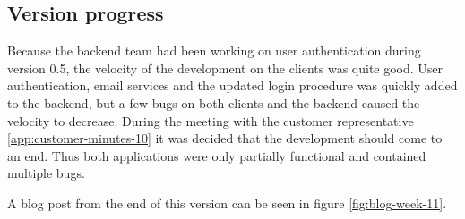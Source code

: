 \subsection{Version progress}
Because the \gls{backend} team had been working on user authentication during version 0.5, the velocity of the development on the clients was quite good. User authentication, email services and the updated login procedure was quickly added to the \gls{backend}, but a few bugs on both clients and the \gls{backend} caused the velocity to decrease. During the meeting with the customer representative \ref{app:customer-minutes-10} it was decided that the development should come to an end. Thus both applications were only partially functional and contained multiple bugs.

A blog post from the end of this version can be seen in figure \ref{fig:blog-week-11}. 

